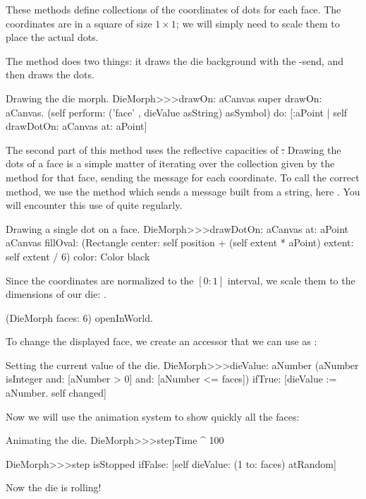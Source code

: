 \documentclass[a4paper,10pt,twoside]{book}
\begin{document}
These methods define collections of the coordinates of dots for each face. The coordinates are in a square of size $1\times1$; we will simply need to scale them to place the actual dots.

The  method does two things: it draws the die background with the -send, and then draws the dots.
\begin{method}{Drawing the die morph.}
DieMorph>>>drawOn: aCanvas
	super drawOn: aCanvas.
	(self perform: ('face' , dieValue asString) asSymbol)
		do: [:aPoint | self drawDotOn: aCanvas at: aPoint]
\end{method}

The second part of this method uses the reflective capacities of \st.
Drawing the dots of a face is a simple matter of iterating over the collection given by the  method for that face, sending the  message for each coordinate. To call the correct  method, we use the  method which sends a message built from a string, here . You will encounter this use of  quite regularly.
\begin{method}{Drawing a single dot on a face.}
DieMorph>>>drawDotOn: aCanvas at: aPoint
	aCanvas
		fillOval: (Rectangle
			center: self position + (self extent * aPoint)
			extent: self extent / 6)
		color: Color black
\end{method}

Since the coordinates are normalized to the $[0{:}1]$ interval, we scale them to the dimensions of our die: .

\begin{code}{}
(DieMorph faces: 6) openInWorld.
\end{code}

To change the displayed face, we create an accessor that we can use as :
\begin{method}{Setting the current value of the die.}
DieMorph>>>dieValue: aNumber
	(aNumber isInteger
			and: [aNumber > 0]
			and: [aNumber <= faces])
		ifTrue:
			[dieValue := aNumber.
			self changed]
\end{method}

Now we will use the animation system to show quickly all the faces:
\begin{methods}{Animating the die.}
DieMorph>>>stepTime
	^ 100

DieMorph>>>step
	isStopped ifFalse: [self dieValue: (1 to: faces) atRandom]
\end{methods}
Now the die is rolling!
\end{document}
